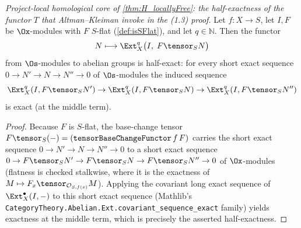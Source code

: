 \begin{lemma}
  \label{lem:ext_tensor_halfexact}
  \textit{Project-local homological core of \cref{thm:H_locallyFree}: the
  half-exactness of the functor $T$ that Altman--Kleiman invoke in the (1.3)
  proof.}
  Let $f : X \to S$, let $I, F$ be $\Ox$-modules with $F$ $S$-flat
  (\cref{def:isSFlat}), and let $q \in \mathbb{N}$. Then the functor
  \[
    N \longmapsto \Ext^q_X\bigl(I,\; F \tensor_S N\bigr)
  \]
  from $\Os$-modules to abelian groups is half-exact: for every short exact
  sequence $0 \to N' \to N \to N'' \to 0$ of $\Os$-modules the induced sequence
  \[
    \Ext^q_X(I, F\tensor_S N') \to \Ext^q_X(I, F\tensor_S N) \to
      \Ext^q_X(I, F\tensor_S N'')
  \]
  is exact (at the middle term).
  \begin{proof}
    Because $F$ is $S$-flat, the base-change tensor $F \tensor_S (-) =
    (\mathtt{tensorBaseChangeFunctor}\,f\,F)$ carries the short exact sequence
    $0 \to N' \to N \to N'' \to 0$ to a short exact sequence
    $0 \to F\tensor_S N' \to F\tensor_S N \to F\tensor_S N'' \to 0$ of
    $\Ox$-modules (flatness is checked stalkwise, where it is the exactness of
    $M \mapsto F_x \tensor_{\mathcal{O}_{S,f(x)}} M$). Applying the covariant long
    exact sequence of $\Ext^{\bullet}_X(I, -)$ to this short exact sequence
    (Mathlib's \texttt{CategoryTheory.Abelian.Ext.covariant\_sequence\_exact}
    family) yields exactness at the middle term, which is precisely the asserted
    half-exactness.
  \end{proof}
\end{lemma}

